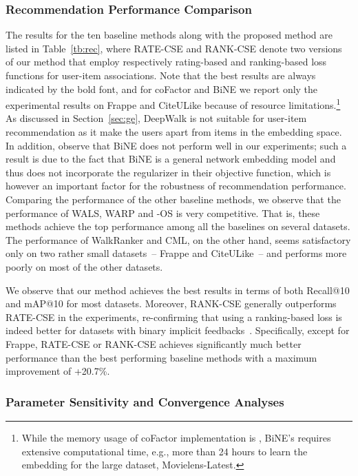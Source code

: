 \documentclass[sigconf,anonymous=false]{acmart}
\begin{document}
\subsubsection{Recommendation Performance Comparison}
The results for the ten baseline methods along with the proposed method are
listed in Table~\ref{tb:rec}, where RATE-CSE and RANK-CSE denote two versions
of our method that employ respectively
rating-based and ranking-based loss functions for user-item associations.
Note that the best results are always indicated by the bold font, and for
coFactor and BiNE we report only the experimental results on Frappe and
CiteULike because of resource limitations.\footnote{While the memory usage of
  coFactor implementation is , BiNE's requires extensive
  computational time, e.g., more than 24 hours to learn the embedding for the
large dataset, Movielens-Latest.}
As discussed in Section~\ref{sec:ge}, DeepWalk is not suitable for user-item
recommendation as it make the users apart from items in the embedding space. 
In addition, observe that BiNE does not perform well in our experiments; such a
result is due to the fact that BiNE is a general network embedding model and
thus does not incorporate the regularizer in their objective function, which is
however an important factor for the robustness of recommendation performance.
Comparing the performance of the other baseline methods, we observe that
the performance of WALS, WARP and -OS is very competitive. That is, these
methods achieve the top performance among all the baselines on several datasets.
The performance of WalkRanker and CML, on the other hand, seems
satisfactory only on two rather small datasets~-- Frappe and
CiteULike~-- and performs more poorly on most of the other datasets.

We observe that our method achieves the best results in terms of both Recall@10
and mAP@10 for most datasets. Moreover, RANK-CSE generally outperforms
RATE-CSE in the experiments, re-confirming that using a ranking-based loss is
indeed better for datasets with binary implicit feedbacks~\cite{bpr,warp,kos}.
Specifically, except for Frappe, RATE-CSE or RANK-CSE achieves significantly
much better performance than the best performing baseline methods with a
maximum improvement of +20.7\%.

\subsubsection{Parameter Sensitivity and Convergence Analyses}\label{sec:sens}
\end{document}
